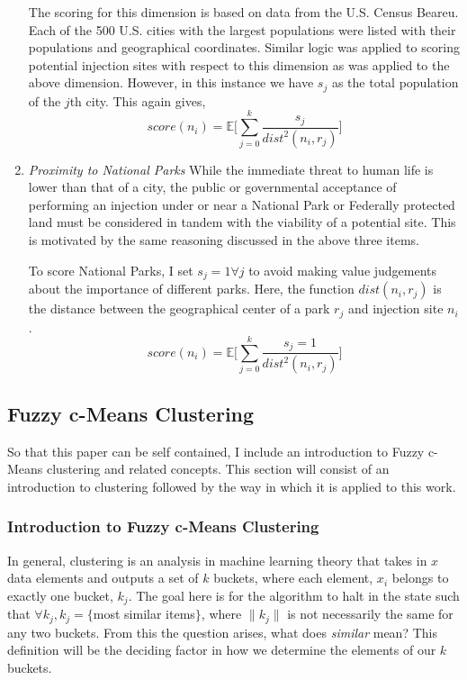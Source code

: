 \documentclass[letterpaper, 12pt]{article}
\begin{document}
\begin{enumerate}
The scoring for this dimension is based on data from the U.S. Census Beareu. Each of the 500 U.S. cities with the largest populations were listed with their populations and geographical coordinates. Similar logic was applied to scoring potential injection sites with respect to this dimension as was applied to the above dimension. However, in this instance we have $s_j$ as the total population of the $j$th city. This again gives,
$$score(n_i) =  \mathbb{E}\bigg[\sum_{j=0}^k \frac{s_j}{dist^2(n_i, r_j)}\bigg]$$


\item \emph{Proximity to National Parks} While the immediate threat to human life is lower than that of a city, the public or governmental acceptance of performing an injection under or near a National Park or Federally protected land must be considered in tandem with the viability of a potential site. This is motivated by the same reasoning discussed in the above three items.

To score National Parks, I set $s_j = 1 \forall j$ to avoid making value judgements about the importance of different parks. Here, the function $dist(n_i, r_j)$ is the distance between the geographical center of a park $r_j$ and injection site $n_i$.
$$score(n_i) =  \mathbb{E}\bigg[\sum_{j=0}^k \frac{s_j = 1}{dist^2(n_i, r_j)}\bigg]$$

\end{enumerate} 

\subsection{Fuzzy c-Means Clustering}\label{fuzz}
So that this paper can be self contained, I include an introduction to Fuzzy c-Means clustering and related concepts. This section will consist of an introduction to clustering followed by the way in which it is applied to this work.

\subsubsection{Introduction to Fuzzy c-Means Clustering}
\par In general, clustering is an analysis in machine learning theory that takes in $x$ data elements and outputs a set of $k$ buckets, where each element, $x_i$ belongs to exactly one bucket, $k_j$. The goal here is for the algorithm to halt in the state such that $\forall k_j, k_j = \{$most similar items$\}$, where $\|k_j\|$ is not necessarily the same for any two buckets. From this the question arises, what does \emph{similar} mean? This definition will be the deciding factor in how we determine the elements of our $k$ buckets.   
\end{document}
